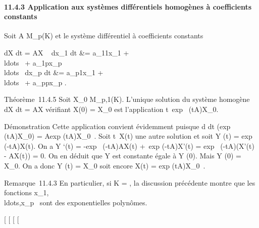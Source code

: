 \documentclass[]{article}
\begin{document}
\paragraph{11.4.3 Application aux systèmes différentiels homogènes à
coefficients constants}

Soit A \in M_p(K) et le système différentiel à coefficients
constants

 dX \over dt = AX \Leftrightarrow
\left \ \cases 
dx_1 \over dt &= a_11x_1 +
\\ldots~ +
a_1px_p \cr
\\ldots~
\cr  dx_p \over dt &=
a_p1x_1 +
\\ldots~ +
a_ppx_p  \right .

Théorème~11.4.5 Soit X_0 \in M_p,1(K). L'unique solution
du système homogène  dX \over dt = AX vérifiant X(0)
= X_0 est l'application
t\mapsto~exp~
(tA)X_0.

Démonstration Cette application convient évidemment puisque  d
\over dt (exp~
(tA)X_0) = Aexp (tA)X_0~.
Soit t\mapsto~X(t) une autre solution et soit Y (t)
= exp~ (-tA)X(t). On a Y `(t) =
-exp~ (-tA)AX(t) +\
exp (-tA)X'(t) = exp~ (-tA)(X'(t) - AX(t)) =
0. On en déduit que Y est constante égale à Y (0). Mais Y (0) =
X_0. On a donc Y (t) = X_0 soit encore X(t)
= exp (tA)X_0~.

Remarque~11.4.3 En particulier, si K = , la discussion précédente
montre que les fonctions
x_1,\\ldots,x_p~
sont des exponentielles polynômes.

[
[
[
[
\end{document}
